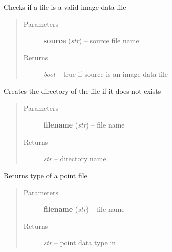 \documentclass[letterpaper,10pt,english]{sphinxmanual}
\begin{document}

\begin{fulllineitems}
\label{api/ClearMap.IO:ClearMap.IO.IO.isDataFile}
Checks if a file is a valid image data file
\begin{quote}\begin{description}
\item[{Parameters}] \leavevmode
\textbf{source} (\emph{str}) --
source file name

\item[{Returns}] \leavevmode
\emph{bool} --
true if source is an image data file

\end{description}\end{quote}

\end{fulllineitems}


\begin{fulllineitems}
\label{api/ClearMap.IO:ClearMap.IO.IO.createDirectory}
Creates the directory of the file if it does not exists
\begin{quote}\begin{description}
\item[{Parameters}] \leavevmode
\textbf{filename} (\emph{str}) --
file name

\item[{Returns}] \leavevmode
\emph{str} --
directory name

\end{description}\end{quote}

\end{fulllineitems}


\begin{fulllineitems}
\label{api/ClearMap.IO:ClearMap.IO.IO.pointFileNameToType}
Returns type of a point file
\begin{quote}\begin{description}
\item[{Parameters}] \leavevmode
\textbf{filename} (\emph{str}) --
file name

\item[{Returns}] \leavevmode
\emph{str} --
point data type in {\hyperref[api/ClearMap.IO:ClearMap.IO.IO.pointFileTypes]{\emph{}}}

\end{description}\end{quote}

\end{fulllineitems}
\end{document}
